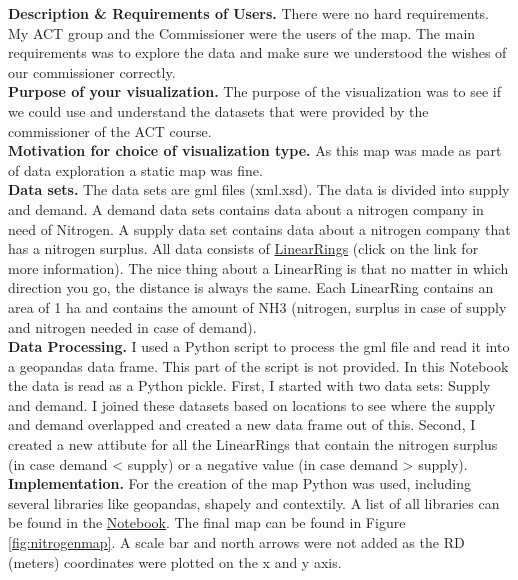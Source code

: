 \documentclass{article}
\begin{document}
\noindent
\textbf{Description \& Requirements of Users.}
There were no hard requirements.
My ACT group and the Commissioner were the users of the map. 
The main requirements was to explore the data and make sure we understood the wishes of our commissioner correctly.
\\

\noindent
\textbf{Purpose of your visualization.}
The purpose of the visualization was to see if we could use and understand the datasets that were provided by the commissioner of the ACT course.
\\

\noindent
\textbf{Motivation for choice of visualization type.}
As this map was made as part of data exploration a static map was fine.
\\

\noindent
\textbf{Data sets.}
The data sets are gml files (xml.xsd).
The data is divided into supply and demand.
A demand data sets contains data about a nitrogen company in need of Nitrogen. 
A supply data set contains data about a nitrogen company that has a nitrogen surplus.
All data consists of \href{https://shapely.readthedocs.io/en/stable/manual.html#linearrings}{LinearRings} (click on the link for more information).
The nice thing about a LinearRing is that no matter in which direction you go, the distance is always the same.
Each LinearRing contains an area of 1 ha and contains the amount of NH3 (nitrogen, surplus in case of supply and nitrogen needed in case of demand).
\\

\noindent
\textbf{Data Processing.}
I used a Python script to process the gml file and read it into a geopandas data frame. 
This part of the script is not provided.
In this Notebook the data is read as a Python pickle. 
First, I started with two data sets: Supply and demand.
I joined these datasets based on locations to see where the supply and demand overlapped and created a new data frame out of this.
Second, I created a new attibute for all the LinearRings that contain the nitrogen surplus (in case demand < supply) or a negative value (in case demand > supply).
\\

\noindent
\textbf{Implementation.}
For the creation of the map Python was used, including several libraries like geopandas, shapely and contextily. A list of all libraries can be found in the \href{https://github.com/RobertvdV/GRS60312_RemoteSensingAndGISIntergration_IDV_Portfolio/blob/master/notebooks/1.0-LinearRingMapCreator.ipynb}{Notebook}.
The final map can be found in Figure \ref{fig:nitrogenmap}.
A scale bar and north arrows were not added as the RD (meters) coordinates were plotted on the x and y axis.
\end{document}
